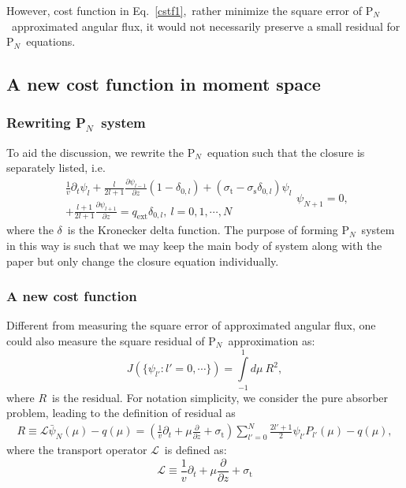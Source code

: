 \documentclass[review]{elsarticle}
\newcommand{\st}{\sigma_\mathrm{t}}
\newcommand{\pn}{P$_N$}
\newcommand{\ppz}{\frac{\partial}{\partial z}}
\newcommand{\psii}[1]{\psi_\ensuremath{{#1}}}
\begin{document}
However, cost function in Eq.~\eqref{cstf1},~rather minimize the square error of \pn~approximated angular flux, it would not necessarily preserve a small residual for \pn~equations.

\subsection{A new cost function in moment space}
\subsubsection{Rewriting \pn~system}
To aid the discussion, we rewrite the \pn~equation such that the closure is separately listed, i.e.
\begin{subequations}
\begin{align}\label{pnmain}
\frac{1}{v}\partial_t\psi_l+\frac{l}{2l+1}\frac{\partial\psi_{l-1}}{\partial z}(1-\delta_{0,l})+(\sigma_\mathrm{t}-\sigma_\mathrm{s}\delta_{0,l})\psi_l\\\nonumber
+\frac{l+1}{2l+1}\frac{\partial\psi_{l+1}}{\partial z}=q_\mathrm{ext}\delta_{0,l},~l=0,1,\cdots,N
\end{align}
\begin{equation}\label{zeroclose}
\psii{N+1}=0,
\end{equation}
\end{subequations}
where the $\delta$~is the Kronecker delta function. The purpose of forming \pn~system in this way is such that we may keep the main body of system along with the paper but only change the closure equation individually.

\subsubsection{A new cost function}
Different from measuring the square error of approximated angular flux, one could also measure the square residual of \pn~approximation as:
\begin{equation}
J(\{\psii{l'}:l'=0,\cdots\})=\int\limits_{-1}^{1}d\mu~R^2,
\end{equation}
where $R$~is the residual. For notation simplicity, we consider the pure absorber problem, leading to the definition of residual as
\begin{align}\label{res}
R\equiv\mathcal{L}\bar{\psi}_N(\mu)-q(\mu)
=\left(\frac{1}{v}\partial_t+\mu\ppz+\st\right)\sum\limits_{l'=0}^{N}\frac{2l'+1}{2}\psii{l'}P_{l'}(\mu)-q(\mu),
\end{align}
where the transport operator $\mathcal{L}$~is defined as:
\begin{equation}
\mathcal{L}\equiv\frac{1}{v}\partial_t+\mu\ppz+\st
\end{equation}
\end{document}
